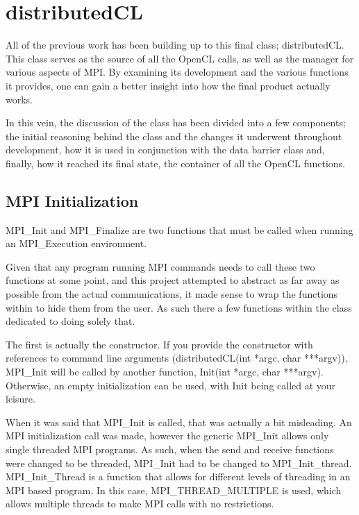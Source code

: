 \documentclass[../thesis.tex]{subfiles}
\begin{document}
\section{distributedCL} %
\label{sec:distributedcl}

All of the previous work has been building up to this final class; distributedCL. This class serves as the source of all the OpenCL calls, as well as the manager for various aspects of MPI. By examining its development and the various functions it provides, one can gain a better insight into how the final product actually works.

In this vein, the discussion of the class has been divided into a few components; the initial reasoning behind the class and the changes it underwent throughout development, how it is used in conjunction with the data barrier class and, finally, how it reached its final state, the container of all the OpenCL functions.
\subsection{MPI Initialization} %
\label{sub:mpi_initialization}
    MPI\_Init and MPI\_Finalize are two functions that must be called when running an MPI\_Execution environment.

    Given that any program running MPI commands needs to call these two functions at some point, and this project attempted to abstract as far away as possible from the actual communications, it made sense to wrap the functions within to hide them from the user. As such there a few functions within the class dedicated to doing solely that. 

    The first is actually the constructor. If you provide the constructor with references to command line arguments (distributedCL(int *argc, char ***argv)), MPI\_Init will be called by another function, Init(int *argc, char ***argv). Otherwise, an empty initialization can be used, with Init being called at your leisure.

    When it was said that MPI\_Init is called, that was actually a bit misleading. An MPI initialization call was made, however the generic MPI\_Init allows only single threaded MPI programs. As such, when the send and receive functions were changed to be threaded, MPI\_Init had to be changed to MPI\_Init\_thread. MPI\_Init\_Thread is a function that allows for different levels of threading in an MPI based program. In this case, MPI\_THREAD\_MULTIPLE is used, which allows multiple threads to make MPI calls with no restrictions.
\end{document}
